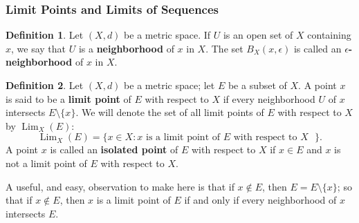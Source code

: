 \documentclass[9pt,reqno]{amsart}
\theoremstyle{definition}
\newtheorem{defi}{Definition}[section]
\DeclareMathOperator{\Lim}{Lim}
\begin{document}
\subsubsection{Limit Points and Limits of Sequences}
\begin{defi}
Let $(X,d)$ be a metric space. If $U$ is an open set of $X$ containing $x$, we say that $U$ is a \textbf{neighborhood} of $x$ in $X$. The set $B_X(x, \epsilon)$ is called an $\epsilon$\textbf{-neighborhood} of $x$ in $X$.	
\end{defi}
\begin{defi}
Let $(X,d)$ be a metric space; let $E$ be a subset of $X$. A point $x$ is said to be a \textbf{limit point} of $E$ with respect to $X$ if every neighborhood $U$ of $x$ intersects $E \setminus \{x \}$. We will denote the set of all limit points of $E$ with respect to $X$ by $\Lim_X(E)$:
\[ 
\Lim _X(E) = \{ x \in X \colon x \text{ is a limit point of $E$ with respect to $X$ } \}.
\]
A point $x$ is called an \textbf{isolated point} of $E$ with respect to $X$ if $x \in E$ and $x$ is not a limit point of $E$ with respect to $X$. 
\end{defi}
A useful, and easy, observation to make here is that if $x \notin E$, then $E = E \setminus \{x \}$; so that if $x \notin E$, then $x$ is a limit point of $E$ if and only if every neighborhood of $x$ intersects $E$. 
\end{document}
